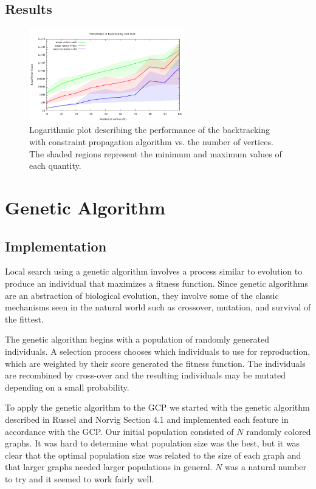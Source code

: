 \documentclass{article}
\begin{document}
	\subsection{Results}
	
		\begin{figure}[h!]
			\centering
			\includegraphics[width=0.6\textwidth]{../results_5/backtracking_mac/bt_mac_performance}
			\caption{Logarithmic plot describing the performance of the backtracking with constraint propagation algorithm vs. the number of vertices. The shaded regions represent the minimum and maximum values of each quantity.}
		\end{figure}
	
\section{Genetic Algorithm}

	\subsection{Implementation}
	Local search using a genetic algorithm involves a process similar to evolution to produce an individual that maximizes a fitness function. Since genetic algorithms are an abstraction of biological evolution, they involve some of the classic mechanisms seen in the natural world such as crossover, mutation, and survival of the fittest\cite{genetic}.
	
	The genetic algorithm begins with a population of randomly generated individuals. A selection process chooses which individuals to use for reproduction, which are weighted by their score generated the fitness function. The individuals are recombined by cross-over and the resulting individuals may be mutated depending on a small probability.
	
	To apply the genetic algorithm to the GCP we started with the genetic algorithm described in Russel and Norvig Section 4.1\cite{ai} and implemented each feature in accordance with the GCP. Our initial population consisted of $N$ randomly colored graphs. It was hard to determine what population size was the best, but it was clear that the optimal population size was related to the size of each graph and that larger graphs needed larger populations in general. $N$ was a natural number to try and it seemed to work fairly well.
	
\end{document}

